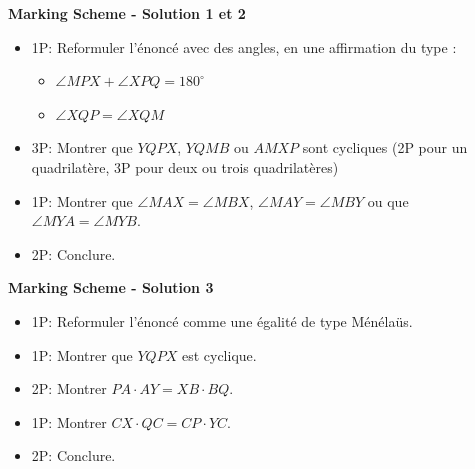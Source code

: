{\bigskip

\textbf{Marking Scheme - Solution 1 et 2}

\begin{itemize}
    \item 1P: Reformuler l'énoncé avec des angles, en une affirmation du type :
    \begin{itemize}
        \item $\angle MPX+\angle XPQ=180^\circ$
        \item $\angle XQP=\angle XQM$
    \end{itemize}
    \item 3P: Montrer que $YQPX$, $YQMB$ ou $AMXP$ sont cycliques (2P pour un quadrilatère, 3P pour deux ou trois quadrilatères)
    \item 1P: Montrer que $\angle MAX=\angle MBX$, $\angle MAY=\angle MBY$ ou que $\angle MYA=\angle MYB$.
    \item 2P: Conclure.
\end{itemize}

\textbf{Marking Scheme - Solution 3}

\begin{itemize}
    \item 1P: Reformuler l'énoncé comme une égalité de type Ménélaüs.
    \item 1P: Montrer que $YQPX$ est cyclique.
    \item 2P: Montrer $PA\cdot AY=XB\cdot BQ$.
    \item 1P: Montrer $CX\cdot QC=CP\cdot YC$.
    \item 2P: Conclure.
\end{itemize}
}
